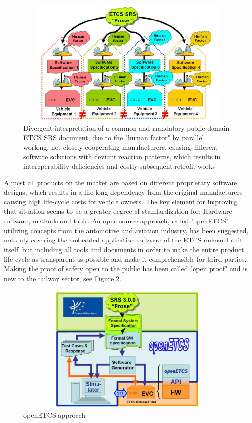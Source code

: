 \documentclass{template/openetcs_report}
\begin{document}
\begin{figure}[h]
\centering
\includegraphics[width=1.0\textwidth, height=240px]{openETCS3}
\caption{Divergent interpretation of a common and mandatory public domain ETCS SRS document, due to the "human factor" by parallel working, not closely cooperating manufacturers, causing different software solutions with deviant reaction patterns, which results in interoperability deficiencies and costly subsequent retrofit works}
\label{fig:openETCS3}
\end{figure}

Almost all products on the market are based on different proprietary software designs, which results in a life-long dependency from the original manufacturers causing high life-cycle costs for vehicle owners. The key element for improving that situation seems to be a greater degree of standardization for: Hardware, software, methods and tools.
An open source approach, called "openETCS" utilizing concepts from the automotive and
aviation industry, has been suggested, not only covering the embedded application software of the ETCS onboard unit itself, but including all tools and documents in order to make the entire product life cycle as transparent as possible and make it comprehensible for third parties.
Making the proof of safety open to the public has been called "open proof" and is new to the railway sector, see Figure \ref{fig:openETCS4}.

\begin{figure}[h]
\centering
\includegraphics[width=1.0\textwidth, height=242px]{openETCS4}
\caption{openETCS approach}
\label{fig:openETCS4}
\end{figure}
\end{document}
